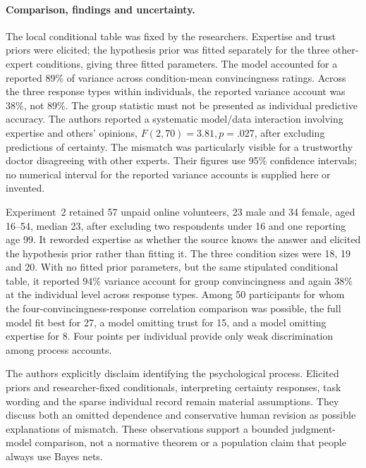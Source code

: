 \paragraph{Comparison, findings and uncertainty.}
The local conditional table was fixed by the researchers. Expertise and
trust priors were elicited; the hypothesis prior was fitted separately
for the three other-expert conditions, giving three fitted parameters.
The model accounted for a reported 89\% of variance across condition-mean
convincingness ratings. Across the three response types within individuals,
the reported variance account was 38\%, not 89\%. The group statistic
must not be presented as individual predictive accuracy. The authors
reported a systematic model/data interaction involving expertise and
others' opinions, \(F(2,70)=3.81,p=.027\), after excluding predictions
of certainty. The mismatch was particularly visible for a trustworthy
doctor disagreeing with other experts. Their figures use 95\% confidence
intervals; no numerical interval for the reported variance accounts is
supplied here or invented.
\cite[accepted manuscript, pp.~20--25]{HarrisHahnMadsenHsu2016Expert}

Experiment~2 retained 57 unpaid online volunteers, 23 male and 34 female,
aged 16--54, median 23, after excluding two respondents under 16 and one
reporting age 99. It reworded expertise as whether the source knows the
answer and elicited the hypothesis prior rather than fitting it.
The three condition sizes were 18, 19 and 20. With no fitted prior
parameters, but the same stipulated conditional table, it reported 94\%
variance account for group convincingness and again 38\% at the individual
level across response types. Among 50 participants for whom the
four-convincingness-response correlation comparison was possible, the
full model fit best for 27, a model omitting trust for 15, and a model
omitting expertise for 8. Four points per individual provide only weak
discrimination among process accounts.
\cite[accepted manuscript, pp.~25--31]{HarrisHahnMadsenHsu2016Expert}

The authors explicitly disclaim identifying the psychological process.
Elicited priors and researcher-fixed conditionals, interpreting certainty
responses, task wording and the sparse individual record remain material
assumptions. They discuss both an omitted dependence and conservative
human revision as possible explanations of mismatch. These observations
support a bounded judgment-model comparison, not a normative theorem
or a population claim that people always use Bayes nets.
\cite[accepted manuscript, pp.~31--36]{HarrisHahnMadsenHsu2016Expert}

